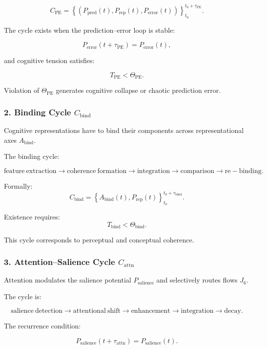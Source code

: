 \[
 C_{\mathrm{PE}} =
 \left\{
   (P_{\mathrm{pred}}(t),
    P_{\mathrm{rep}}(t),
    P_{\mathrm{error}}(t))
 \right\}_{t_0}^{t_0+\tau_{\mathrm{PE}}}.
\]

The cycle exists when the prediction–error loop is stable:

\[
 P_{\mathrm{error}}(t+\tau_{\mathrm{PE}}) = P_{\mathrm{error}}(t),
\]

and cognitive tension satisfies:

\[
 T_{\mathrm{PE}} < \Theta_{\mathrm{PE}}.
\]

Violation of $\Theta_{\mathrm{PE}}$ generates cognitive collapse or chaotic
prediction error.

\subsubsection{2. Binding Cycle $C_{\mathrm{bind}}$}

Cognitive representations have to bind their components across
representational axes $A_{\mathrm{bind}}$.

The binding cycle:

\[
 \mathrm{feature\ extraction}
 \to
 \mathrm{coherence\ formation}
 \to
 \mathrm{integration}
 \to
 \mathrm{comparison}
 \to
 \mathrm{re-binding}.
\]

Formally:
\[
 C_{\mathrm{bind}} =
 \left\{
   A_{\mathrm{bind}}(t), P_{\mathrm{rep}}(t)
 \right\}_{t_0}^{t_0+\tau_{\mathrm{bind}}}.
\]

Existence requires:
\[
 T_{\mathrm{bind}} < \Theta_{\mathrm{bind}}.
\]

This cycle corresponds to perceptual and conceptual coherence.

\subsubsection{3. Attention–Salience Cycle $C_{\mathrm{attn}}$}

Attention modulates the salience potential $P_{\mathrm{salience}}$ and
selectively routes flows $J_6$.

The cycle is:

\[
  \mathrm{salience\ detection}
  \to
  \mathrm{attentional\ shift}
  \to
  \mathrm{enhancement}
  \to
  \mathrm{integration}
  \to
  \mathrm{decay}.
\]

The recurrence condition:

\[
  P_{\mathrm{salience}}(t+\tau_{\mathrm{attn}}) = P_{\mathrm{salience}}(t).
\]

